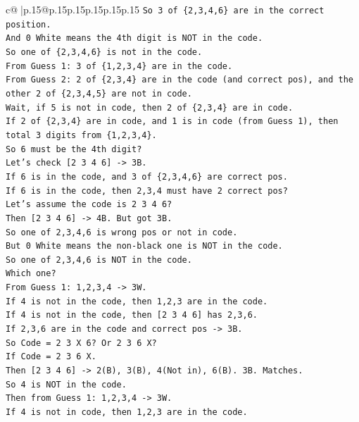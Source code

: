 \documentclass{article}
\begin{document}
{\begin{supertabular}{c@{$\;$}|p{.15\linewidth}@{}p{.15\linewidth}p{.15\linewidth}p{.15\linewidth}p{.15\linewidth}p{.15\linewidth}}
{{{\texttt{So 3 of \{2,3,4,6\} are in the correct position.} \\
\texttt{And 0 White means the 4th digit is NOT in the code.} \\
\texttt{So one of \{2,3,4,6\} is not in the code.} \\
\texttt{From Guess 1: 3 of \{1,2,3,4\} are in the code.} \\
\texttt{From Guess 2: 2 of \{2,3,4\} are in the code (and correct pos), and the other 2 of \{2,3,4,5\} are not in code.} \\
\texttt{Wait, if 5 is not in code, then 2 of \{2,3,4\} are in code.} \\
\texttt{If 2 of \{2,3,4\} are in code, and 1 is in code (from Guess 1), then total 3 digits from \{1,2,3,4\}.} \\
\texttt{So 6 must be the 4th digit?} \\
\texttt{Let's check {[}2 3 4 6{]} {-}> 3B.} \\
\texttt{If 6 is in the code, and 3 of \{2,3,4,6\} are correct pos.} \\
\texttt{If 6 is in the code, then 2,3,4 must have 2 correct pos?} \\
\texttt{Let's assume the code is 2 3 4 6?} \\
\texttt{Then {[}2 3 4 6{]} {-}> 4B. But got 3B.} \\
\texttt{So one of 2,3,4,6 is wrong pos or not in code.} \\
\texttt{But 0 White means the non{-}black one is NOT in the code.} \\
\texttt{So one of 2,3,4,6 is NOT in the code.} \\
\texttt{Which one?} \\
\texttt{From Guess 1: 1,2,3,4 {-}> 3W.} \\
\texttt{If 4 is not in the code, then 1,2,3 are in the code.} \\
\texttt{If 4 is not in the code, then {[}2 3 4 6{]} has 2,3,6.} \\
\texttt{If 2,3,6 are in the code and correct pos {-}> 3B.} \\
\texttt{So Code = 2 3 X 6? Or 2 3 6 X?} \\
\texttt{If Code = 2 3 6 X.} \\
\texttt{Then {[}2 3 4 6{]} {-}> 2(B), 3(B), 4(Not in), 6(B). 3B. Matches.} \\
\texttt{So 4 is NOT in the code.} \\
\texttt{Then from Guess 1: 1,2,3,4 {-}> 3W.} \\
\texttt{If 4 is not in code, then 1,2,3 are in the code.} \\
}}}
\end{supertabular}}
\end{document}

